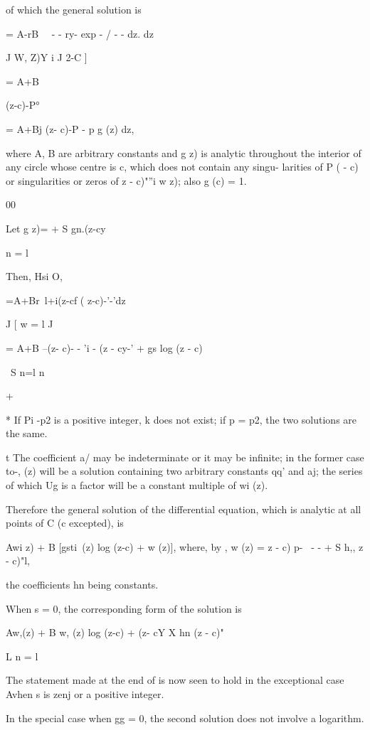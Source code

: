 of which the general solution is

 = A-rB\ ~ - - ry- exp - / - - dz. dz

J W, Z)Y i J 2-C ]

= A+B

(z-c)-P°

= A+Bj (z- c)-P - p g (z) dz,

where A, B are arbitrary constants and g z) is analytic throughout the
interior of any circle whose centre is c, which does not contain any
singu- larities of P ( - c) or singularities or zeros of z - c)"''i w
z); also g (c) = 1.

00

Let g z)= + S gn.(z-cy\

n = l

Then, Hsi O,

 =A+Br\ l+i(z-cf ( z-c)-'-'dz

J [ w = l J

= A+B --(z- c)- - 'i - (z - cy-' + gs log (z - c)

\ S n=l n

+ %

* If Pi -p2 is a positive integer, k does not exist; if p = p2, the
two solutions are the same.

t The coefficient a/ may be indeterminate or it may be infinite; in
the former case to-, (z) will be a solution containing two arbitrary
constants qq' and aj; the series of which Ug is a factor will be a
constant multiple of wi (z).

%
%

Therefore the general solution of the differential equation, which is
analytic at all points of C (c excepted), is

Awi z) + B [gsti\ (z) log (z-c) + w (z)], where, by , w (z) = z
- c) p- \ - - + S h,, z - c)"l,

the coefficients hn being constants.

When s = 0, the corresponding form of the solution is

Aw,(z) + B w, (z) log (z-c) + (z- cY X hn (z - c)"

L n = l \

The statement made at the end of  is now seen to hold in the
exceptional case Avhen s is zenj or a positive integer.

In the special case when gg = 0, the second solution does not involve
a logarithm.

